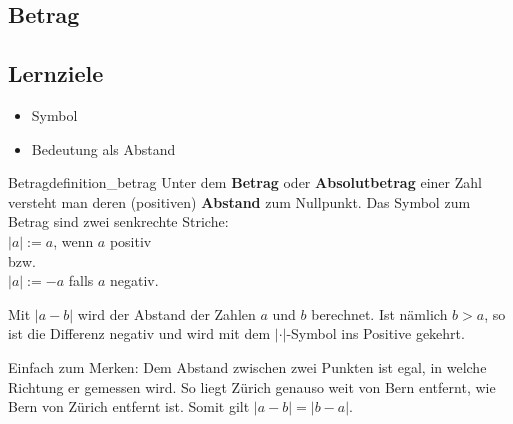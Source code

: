 
\subsection{Betrag}


\subsection*{Lernziele}

\begin{itemize}
  \item Symbol
  \item Bedeutung als Abstand
\end{itemize}


%
%


\newpage
\begin{definition}{Betrag}{definition_betrag}
  Unter dem \textbf{Betrag} oder \textbf{Absolutbetrag} einer Zahl versteht man deren (positiven)
  \textbf{Abstand} zum Nullpunkt. Das Symbol zum Betrag sind zwei
  senkrechte Striche:\\
  $|a| := a$, wenn $a$ positiv\\
  bzw.\\
  $|a| := -a$ falls $a$ negativ.
\end{definition}

\begin{bemerkung}{}{}
Mit $|a - b|$ wird der Abstand der Zahlen $a$ und $b$ berechnet. Ist
nämlich $b > a$, so ist die Differenz negativ und wird mit dem
$| \cdot{} |$-Symbol ins Positive gekehrt.
\end{bemerkung}

\begin{bemerkung}{}{}
  Einfach zum Merken: Dem Abstand zwischen zwei Punkten ist egal, in
  welche Richtung er gemessen wird. So liegt Zürich genauso weit von
  Bern entfernt, wie Bern von Zürich entfernt ist. Somit gilt $|a - b| = |b - a|$.
\end{bemerkung}

